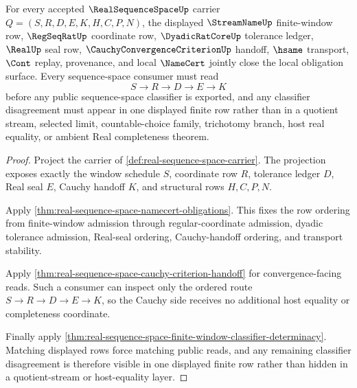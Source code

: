 \begin{theorem}
\label{thm:real-sequence-space-window-seal-obligation-closure}
For every accepted $\RealSequenceSpaceUp$ carrier $Q=(S,R,D,E,K,H,C,P,N)$, the displayed $\StreamNameUp$ finite-window row, $\RegSeqRatUp$ coordinate row, $\DyadicRatCoreUp$ tolerance ledger, $\RealUp$ seal row, $\CauchyConvergenceCriterionUp$ handoff, $\hsame$ transport, $\Cont$ replay, provenance, and local $\NameCert$ jointly close the local obligation surface. Every sequence-space consumer must read
$$
S \longrightarrow R \longrightarrow D \longrightarrow E \longrightarrow K
$$
before any public sequence-space classifier is exported, and any classifier disagreement must appear in one displayed finite row rather than in a quotient stream, selected limit, countable-choice family, trichotomy branch, host real equality, or ambient Real completeness theorem.
\end{theorem}
\begin{proof}
Project the carrier of \autoref{def:real-sequence-space-carrier}. The projection exposes exactly the window schedule $S$, coordinate row $R$, tolerance ledger $D$, Real seal $E$, Cauchy handoff $K$, and structural rows $H,C,P,N$.

Apply \autoref{thm:real-sequence-space-namecert-obligations}. This fixes the row ordering from finite-window admission through regular-coordinate admission, dyadic tolerance admission, Real-seal ordering, Cauchy-handoff ordering, and transport stability.

Apply \autoref{thm:real-sequence-space-cauchy-criterion-handoff} for convergence-facing reads. Such a consumer can inspect only the ordered route $S \longrightarrow R \longrightarrow D \longrightarrow E \longrightarrow K$, so the Cauchy side receives no additional host equality or completeness coordinate.

Finally apply \autoref{thm:real-sequence-space-finite-window-classifier-determinacy}. Matching displayed rows force matching public reads, and any remaining classifier disagreement is therefore visible in one displayed finite row rather than hidden in a quotient-stream or host-equality layer.
\end{proof}

